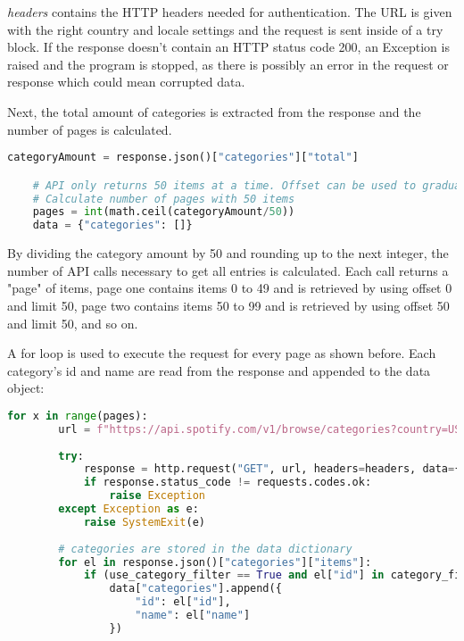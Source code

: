 \emph{headers} contains the HTTP headers needed for authentication.
The URL is given with the right country and locale settings and the request is sent inside of a try block.
If the response doesn't contain an HTTP status code 200, an Exception is raised and the program is stopped,
as there is possibly an error in the request or response which could mean corrupted data.

Next, the total amount of categories is extracted from the response and the number of pages is calculated.

\begin{lstlisting}[language=Python]
    categoryAmount = response.json()["categories"]["total"]

    # API only returns 50 items at a time. Offset can be used to gradually get all items
    # Calculate number of pages with 50 items
    pages = int(math.ceil(categoryAmount/50))
    data = {"categories": []}
\end{lstlisting}

By dividing the category amount by 50 and rounding up to the next integer, the number of API calls necessary to get 
all entries is calculated. Each call returns a "page" of items, page one contains items 0 to 49 and is retrieved by
using offset 0 and limit 50, page two contains items 50 to 99 and is retrieved by using offset 50 and limit 50,
and so on.

A for loop is used to execute the request for every page as shown before.
Each category's id and name are read from the response and appended to the data object:

\begin{lstlisting}[language=Python]
    for x in range(pages):
        url = f"https://api.spotify.com/v1/browse/categories?country=US&locale=en_US&limit=50&offset={x * 50}"
        
        try:
            response = http.request("GET", url, headers=headers, data={})
            if response.status_code != requests.codes.ok:
                raise Exception
        except Exception as e:
            raise SystemExit(e)
        
        # categories are stored in the data dictionary
        for el in response.json()["categories"]["items"]:
            if (use_category_filter == True and el["id"] in category_filter) or use_category_filter == False:
                data["categories"].append({
                    "id": el["id"], 
                    "name": el["name"]
                })
\end{lstlisting}

